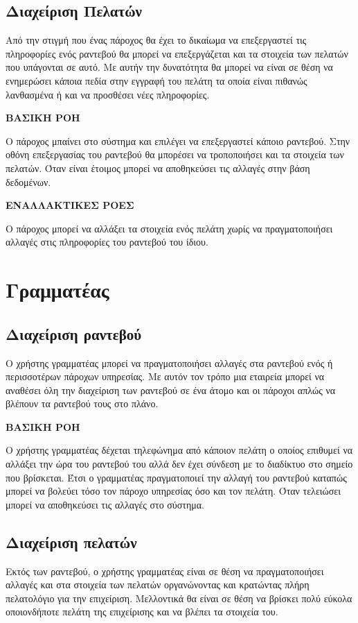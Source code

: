 \subsection {Διαχείριση Πελατών}
Από την στιγμή που ένας πάροχος θα έχει το δικαίωμα να επεξεργαστεί τις πληροφορίες ενός ραντεβού θα μπορεί να επεξεργάζεται και τα στοιχεία των πελατών που υπάγονται σε αυτό. Με αυτήν την δυνατότητα θα μπορεί να είναι σε θέση να ενημερώσει κάποια πεδία στην εγγραφή του πελάτη τα οποία είναι πιθανώς λανθασμένα ή και να προσθέσει νέες πληροφορίες.

\textbf{ΒΑΣΙΚΗ ΡΟΗ}

Ο πάροχος μπαίνει στο σύστημα και επιλέγει να επεξεργαστεί κάποιο ραντεβού. Στην οθόνη επεξεργασίας του ραντεβού θα μπορέσει να τροποποιήσει και τα στοιχεία των πελατών. Όταν είναι έτοιμος μπορεί να αποθηκεύσει τις αλλαγές στην βάση δεδομένων.

\textbf{ΕΝΑΛΛΑΚΤΙΚΕΣ ΡΟΕΣ}

Ο πάροχος μπορεί να αλλάξει τα στοιχεία ενός πελάτη χωρίς να πραγματοποιήσει αλλαγές στις πληροφορίες του ραντεβού του ίδιου.

\section{Γραμματέας}
\subsection{Διαχείριση ραντεβού}
Ο χρήστης γραμματέας μπορεί να πραγματοποιήσει αλλαγές στα ραντεβού ενός ή περισσοτέρων πάροχων υπηρεσίας. Με αυτόν τον τρόπο μια εταιρεία μπορεί να αναθέσει όλη την διαχείριση των ραντεβού σε ένα άτομο και οι πάροχοι απλώς να βλέπουν τα ραντεβού τους στο πλάνο.

\textbf{ΒΑΣΙΚΗ ΡΟΗ}

Ο χρήστης γραμματέας δέχεται τηλεφώνημα από κάποιον πελάτη ο οποίος επιθυμεί να αλλάξει την ώρα του ραντεβού του αλλά δεν έχει σύνδεση με το διαδίκτυο στο σημείο που βρίσκεται. Έτσι ο γραμματέας πραγματοποιεί την αλλαγή του ραντεβού καταπώς μπορεί να βολεύει τόσο τον πάροχο υπηρεσίας όσο και τον πελάτη. Όταν τελειώσει μπορεί να αποθηκεύσει τις αλλαγές στο σύστημα.

\subsection{Διαχείριση πελατών}
Εκτός των ραντεβού, ο χρήστης γραμματέας είναι σε θέση να πραγματοποιήσει αλλαγές και στα στοιχεία των πελατών οργανώνοντας και κρατώντας πλήρη πελατολόγιο για την επιχείριση. Μελλοντικά θα είναι σε θέση να βρίσκει πολύ εύκολα οποιονδήποτε πελάτη της επιχείρισης και να βλέπει τα στοιχεία του.

